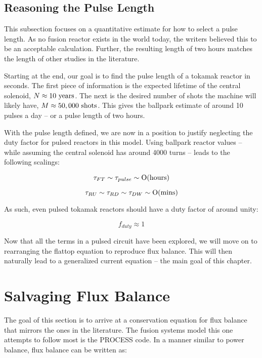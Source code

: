 \subsection{Reasoning the Pulse Length}

This subsection focuses on a quantitative estimate for how to select a pulse length. As no fusion reactor exists in the world today, the writers believed this to be an acceptable calculation. Further, the resulting length of two hours matches the length of other studies in the literature.

Starting at the end, our goal is to find the pulse length of a tokamak reactor in seconds.  The first piece of information is the expected lifetime of the central solenoid, $ N \approx 10 \ \textnormal{years} $. The next is the desired number of shots the machine will likely have, $ M \approx 50,000 \ \textnormal{shots} $. This gives the ballpark estimate of around 10 pulses a day -- or a pulse length of two hours.

With the pulse length defined, we are now in a position to justify neglecting the duty factor for pulsed reactors in this model. Using ballpark reactor values -- while assuming the central solenoid has around 4000 turns -- leads to the following scalings:

\begin{equation}
	\tau_{FT} \sim \tau_{pulse} \sim \textnormal{O(hours)}
\end{equation}

\begin{equation}
	\tau_{RU} \sim \tau_{RD} \sim \tau_{DW} \sim \textnormal{O(mins)}
\end{equation}

As such, even pulsed tokamak reactors should have a duty factor of around unity:

\begin{equation}
	f_{duty} \approx 1
\end{equation}

Now that all the terms in a pulsed circuit have been explored, we will move on to rearranging the flattop equation to reproduce flux balance. This will then naturally lead to a generalized current equation -- the main goal of this chapter.

\section{Salvaging Flux Balance}

The goal of this section is to arrive at a conservation equation for flux balance that mirrors the ones in the literature. The fusion systems model this one attempts to follow most is the PROCESS code.\cite{process} In a manner similar to power balance, flux balance can be written as:

